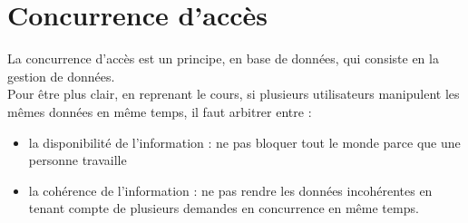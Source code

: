 \documentclass{report}
\begin{document}
\chapter{Concurrence d'accès}
La concurrence d'accès est un principe, en base de données, qui consiste en la gestion de données.\\
Pour être plus clair, en reprenant le cours, si plusieurs utilisateurs manipulent les mêmes données en même temps, il faut arbitrer entre :
\begin{itemize}
\item la disponibilité de l'information : ne pas bloquer tout le monde parce que une personne travaille
\item la cohérence de l'information : ne pas rendre les données incohérentes en tenant compte de plusieurs demandes en concurrence en même temps.
\end{itemize}
\end{document}
